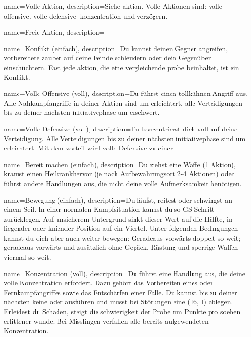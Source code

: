 {
    name={Volle Aktion},
    description={Siehe \gls{aktion}. Volle Aktionen sind: \gls{volle offensive}, \gls{volle defensive}, \gls{konzentration} und \gls{verzögern}.}}

{
    name={Freie Aktion},
    description={}}
        
{
    name={Konflikt (einfach)},
    description={Du kannst deinen Gegner angreifen, vorbereitete \gls{zauber} auf deine Feinde schleudern oder dein Gegenüber \gls{einschüchtern}. Fast jede \gls{aktion}, die eine \gls{vergleichende probe} beinhaltet, ist ein Konflikt.}}

{
    name={Volle Offensive (voll)},
    description={Du führst einen tollkühnen Angriff aus. Alle Nahkampfangriffe in deiner Aktion sind um  erleichtert, alle Verteidigungen bis zu deiner nächsten \gls{initiativephase} um  erschwert.}}

{
    name={Volle Defensive (voll)},
    description={Du konzentrierst dich voll auf deine Verteidigung. Alle Verteidigungen bis zu deiner nächsten \gls{initiativephase} sind um  erleichtert. Mit dem \gls{vorteil}  wird volle Defensive zu einer .}}

{
    name={Bereit machen (einfach)},
     description={Du ziehst eine Waffe (1 Aktion), kramst einen Heiltrankhervor (je nach Aufbewahrungsort 2-4 Aktionen) oder führst andere Handlungen aus, die nicht deine volle Aufmerksamkeit benötigen.}}

{
    name={Bewegung (einfach)},
    description={Du läufst, reitest oder schwingst an einem Seil. In einer normalen Kampfsituation kannst du so GS Schritt zurücklegen. Auf unsicherem Untergrund sinkt dieser Wert auf die Hälfte, in liegender oder kniender Position auf ein Viertel. Unter folgenden Bedingungen kannst du dich aber auch weiter bewegen: Geradeaus vorwärts doppelt so weit; geradeaus vorwärts und zusätzlich ohne Gepäck, Rüstung und sperrige Waffen viermal so weit.}}

{
    name={Konzentration (voll)},
    description={Du führst eine Handlung aus, die deine volle Konzentration erfordert. Dazu gehört das Vorbereiten eines  oder Fernkampfangriffes sowie das Entschärfen einer Falle. Du kannst bis zu deiner nächsten  keine  oder  ausführen und musst bei Störungen eine  (16, \gls{I}) ablegen. Erleidest du Schaden, steigt die \gls{schwierigkeit} der Probe um  Punkte pro soeben erlittener \gls{wunde}. Bei Misslingen verfallen alle bereits aufgewendeten  Konzentration.}}

